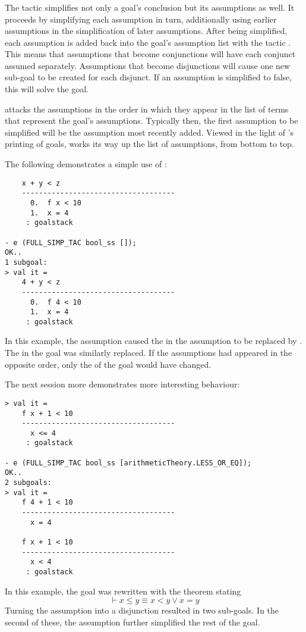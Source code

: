 \subsubsection{}

\noindent
The tactic  simplifies not only a goal's
conclusion but its assumptions as well.  It proceeds by simplifying
each assumption in turn, additionally using earlier assumptions in the
simplification of later assumptions.  After being simplified, each
assumption is added back into the goal's assumption list with the
tactic .  This means that assumptions that
become conjunctions will have each conjunct assumed separately.
Assumptions that become disjunctions will cause one new sub-goal to be
created for each disjunct.  If an assumption is simplified to false,
this will solve the goal.

 attacks the assumptions in the order in which
they appear in the list of terms that represent the goal's
assumptions.  Typically then, the first assumption to be simplified
will be the assumption most recently added.  Viewed in the light of
's printing of goals,  works its
way up the list of assumptions, from bottom to top.

The following demonstrates a simple use of :
\begin{session}
\begin{verbatim}
    x + y < z
    ------------------------------------
      0.  f x < 10
      1.  x = 4
     : goalstack

- e (FULL_SIMP_TAC bool_ss []);
OK..
1 subgoal:
> val it =
    4 + y < z
    ------------------------------------
      0.  f 4 < 10
      1.  x = 4
     : goalstack
\end{verbatim}
\end{session}
In this example, the assumption  caused the 
in the assumption  to be replaced by .  The
 in the goal was similarly replaced.  If the assumptions had
appeared in the opposite order, only the  of the goal would
have changed.

The next session more demonstrates more interesting behaviour:
\begin{session}
\begin{verbatim}
> val it =
    f x + 1 < 10
    ------------------------------------
      x <= 4
     : goalstack

- e (FULL_SIMP_TAC bool_ss [arithmeticTheory.LESS_OR_EQ]);
OK..
2 subgoals:
> val it =
    f 4 + 1 < 10
    ------------------------------------
      x = 4

    f x + 1 < 10
    ------------------------------------
      x < 4
     : goalstack
\end{verbatim}
\end{session}
In this example, the goal was rewritten with the theorem stating \[
\vdash x \leq y \equiv x < y \lor x = y
\]
Turning the assumption into a disjunction resulted in two sub-goals.
In the second of these, the assumption  further
simplified the rest of the goal.

